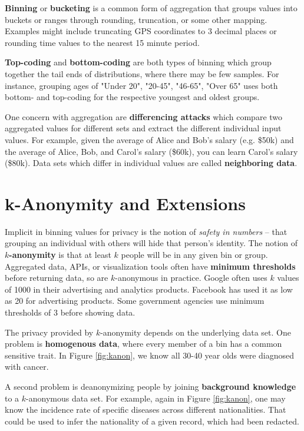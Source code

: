 \documentclass[nobib]{tufte-handout}
\begin{document}
\textbf{Binning} or \textbf{bucketing} is a common form of aggregation that
groups values into buckets or ranges through rounding, truncation, or some
other mapping. Examples might include truncating GPS coordinates to 3 decimal
places or rounding time values to the nearest 15 minute period.

\textbf{Top-coding} and \textbf{bottom-coding} are both types of binning which
group together the tail ends of distributions, where there may be few samples.
For instance, grouping ages of "Under 20", "20-45", "46-65", "Over 65" uses both
bottom- and top-coding for the respective youngest and oldest groups.

One concern with aggregation are \textbf{differencing attacks} which compare two
aggregated values for different sets and extract the different individual input
values. For example, given the average of Alice and Bob’s salary (e.g. \$50k)
and the average of Alice, Bob, and Carol’s salary (\$60k), you can learn
Carol’s salary (\$80k). Data sets which differ in individual values are
called \textbf{neighboring data}.

\section{k-Anonymity and Extensions}

Implicit in binning values for privacy is the notion of
\textit{safety in numbers} -- that grouping an individual with others will hide
that person's identity. The notion of \textbf{$k$-anonymity}
\cite{DBLP:journals/ijufks/Sweene02} is that at least $k$ people will be in any
given bin or group. Aggregated data, APIs, or visualization tools often have
\textbf{minimum thresholds} before returning data, so are $k$-anonymous in
practice. Google often uses $k$ values of 1000 in their advertising and
analytics products. Facebook has used it as low as 20 for advertising products.
Some government agencies use minimum thresholds of 3 before showing data.

The privacy provided by $k$-anonymity depends on the underlying data set. One
problem is \textbf{homogenous data}, where every member of a bin has a common
sensitive trait. In Figure \ref{fig:kanon}, we know all 30-40 year olds were
diagnosed with cancer.

A second problem is deanonymizing people by joining \textbf{background
knowledge} to a $k$-anonymous data set. For example, again in  Figure
\ref{fig:kanon}, one may know the incidence rate of specific diseases  across
different nationalities. That could be used to infer the nationality of a given
record, which had been redacted.
\end{document}
